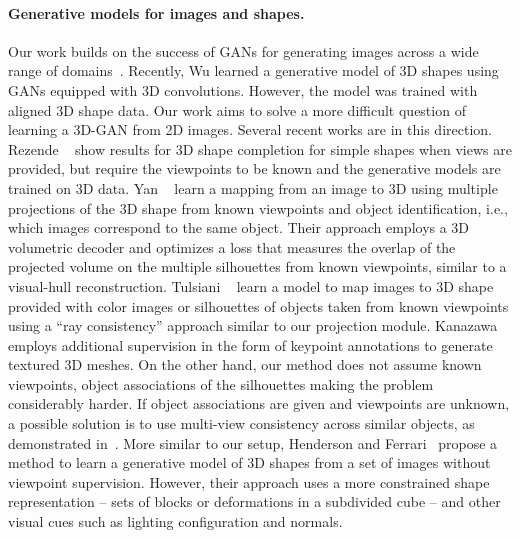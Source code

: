 \paragraph*{Generative models for images and shapes.} Our work builds
on the success of GANs for generating images across a wide range of
domains~\cite{goodfellow2014generative}. 
Recently, Wu \etal \cite{wu2016learning} learned a generative model of
3D shapes using GANs equipped with 3D convolutions.
However, the model was trained with aligned 3D shape data.
Our work aims to solve a more difficult question of learning a 3D-GAN
from 2D images. 
Several recent works are in this direction. 
Rezende \etal~\cite{rezende2016unsupervised} show results for 3D
shape completion for simple shapes when views are provided, 
but require the viewpoints to be known and the generative models are
trained on 3D data. 
Yan \etal~\cite{yan2016perspective} learn a mapping from an image
to 3D using multiple 
projections of the 3D shape from known viewpoints and object
identification, i.e., which images correspond to the same object. 
Their approach employs a 3D volumetric decoder and optimizes a loss that measures the 
overlap of the projected volume on the multiple silhouettes from known viewpoints, 
similar to a visual-hull reconstruction. 
Tulsiani \etal~\cite{drcTulsiani17} learn a model to map images to 3D
shape provided with color images or silhouettes of objects taken from
known viewpoints using a ``ray consistency'' approach similar to our
projection module.
Kanazawa \etal~\cite{cmrKanazawa18} employs additional supervision in the form of
keypoint annotations to generate textured 3D meshes.
On the other hand, our method does not assume known viewpoints,
object associations of the silhouettes making the problem considerably
harder.
If object associations are given and viewpoints are unknown, a possible
solution is to use multi-view consistency across similar objects, as demonstrated in~\cite{mvcTulsiani18}.
More similar to our setup, Henderson and Ferrari~\cite{henderson18} propose a method to learn
a generative model of 3D shapes from a set of images without viewpoint supervision.
However, their approach uses a more constrained shape representation -- sets of blocks or deformations
in a subdivided cube -- and other visual cues such as lighting configuration and normals.

